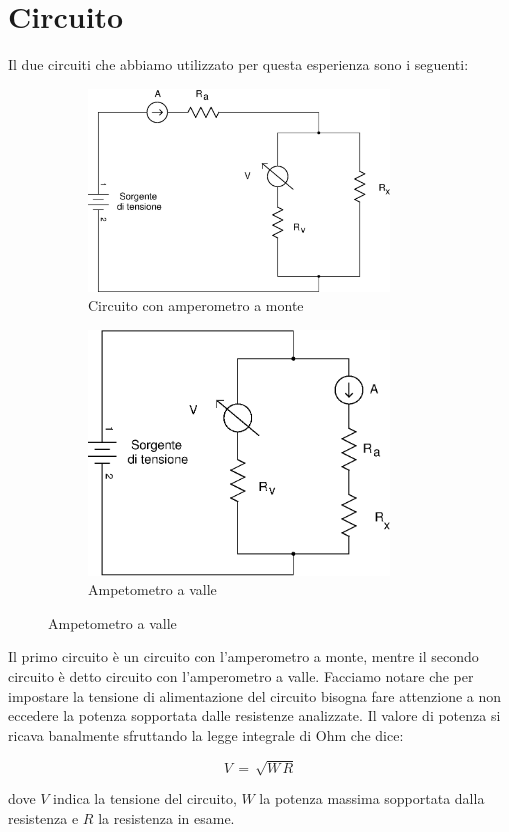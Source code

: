 \section*{Circuito}

Il due circuiti che abbiamo utilizzato per questa esperienza sono i seguenti:

\begin{figure}[h]
  \centering
  \begin{subfigure}[b]{0.45\textwidth}
    \includegraphics[width=8cm]{monte.eps}
    \caption{Circuito con amperometro a monte}
    \label{fig:monte}
  \end{subfigure}
  \qquad
  \begin{subfigure}[b]{0.45\textwidth}
    \includegraphics[width=8cm]{valle.eps}
    \caption{Ampetometro a valle}
    \label{fig:valle}
  \end{subfigure}
\end{figure}

Il primo circuito è un circuito con l'amperometro a monte, mentre il secondo circuito è detto circuito con l'amperometro a valle.
Facciamo notare che per impostare la tensione di alimentazione del circuito bisogna fare attenzione a non eccedere la potenza sopportata dalle resistenze analizzate. Il valore di potenza si ricava banalmente sfruttando la legge integrale di Ohm che dice:

\begin{equation}
	V \,=\, \sqrt{W\,R}
\end{equation}

dove $V$ indica la tensione del circuito, $W$ la potenza massima sopportata dalla resistenza e $R$ la resistenza in esame.




